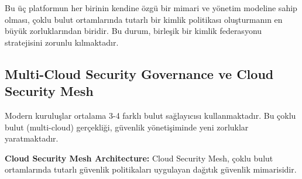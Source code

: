 Bu üç platformun her birinin kendine özgü bir mimari ve yönetim modeline sahip olması, çoklu bulut ortamlarında tutarlı bir kimlik politikası oluşturmanın en büyük zorluklarından biridir. Bu durum, birleşik bir kimlik federasyonu stratejisini zorunlu kılmaktadır.

\subsection{Multi-Cloud Security Governance ve Cloud Security Mesh}

Modern kuruluşlar ortalama 3-4 farklı bulut sağlayıcısı kullanmaktadır. Bu çoklu bulut (multi-cloud) gerçekliği, güvenlik yönetişiminde yeni zorluklar yaratmaktadır.

\textbf{Cloud Security Mesh Architecture:}
Cloud Security Mesh, çoklu bulut ortamlarında tutarlı güvenlik politikaları uygulayan dağıtık güvenlik mimarisidir.

